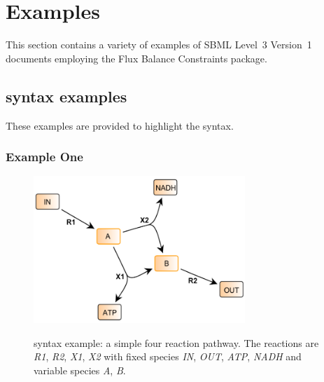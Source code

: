 
\section{Examples}
\label{examples}

This section contains a variety of examples of SBML Level~3 Version~1
documents employing the Flux Balance Constraints package.

\subsection{\FBC syntax examples}

These examples are provided to highlight the \FBCPackage syntax.

\subsubsection{Example One}

\begin{figure}[h]
  \centering
  \includegraphics[width=8cm]{examples/spec-example1.pdf}\\
  \caption{\FBC syntax example: a simple four reaction pathway. The
  reactions are \textit{R1}, \textit{R2}, \textit{X1}, \textit{X2} with
  fixed species \textit{IN}, \textit{OUT}, \textit{ATP}, \textit{NADH} and
  variable species \textit{A}, \textit{B}.}
  \label{fig:example1}
\end{figure}

